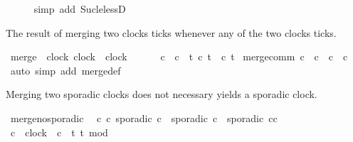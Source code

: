 \begin{isabellebody}
\ \ \ \ \isamarkupfalse%
\ {\isacharparenleft}simp\ add{\isacharcolon}\ Suc{\isacharunderscore}le{\isacharunderscore}lessD{\isacharparenright}\isanewline
{}\isamarkupfalse%
%
\endisatagproof
{\isafoldproof}%
%
\isadelimproof
%
\endisadelimproof
%
\isadelimdocument
%
\endisadelimdocument
%
\isatagdocument
%
\isamarkuptrue%
%
\endisatagdocument
{\isafolddocument}%
%
\isadelimdocument
%
\endisadelimdocument
%
\begin{isamarkuptext}%
The result of merging two clocks ticks whenever any of the two clocks ticks.%
\end{isamarkuptext}\isamarkuptrue%
\isamarkupfalse%
\ merge\ {\isacharcolon}{\isacharcolon}\ {\isacartoucheopen}{\isacharbrackleft}clock{\isacharcomma}\ clock{\isacharbrackright}\ {\isasymRightarrow}\ clock{\isacartoucheclose}\ {\isacharparenleft}\ {\isacartoucheopen}{\isasymoplus}{\isacartoucheclose}\ {}{}{\isacharparenright}\isanewline
\ \ \ {\isacartoucheopen}c{}\ {\isasymoplus}\ c{}\ {\isasymequiv}\ {\isasymlambda}t{\isachardot}\ c{}\ t\ {\isasymor}\ c{}\ t{\isacartoucheclose}\isanewline
\isanewline
{}\isamarkupfalse%
\ merge{\isacharunderscore}comm{\isacharcolon}\ {\isacartoucheopen}c\ {\isasymoplus}\ c{\isacharprime}\ {\isacharequal}\ c{\isacharprime}\ {\isasymoplus}\ c{\isacartoucheclose}\isanewline
%
\isadelimproof
%
\endisadelimproof
%
\isatagproof
{}\isamarkupfalse%
\ {\isacharparenleft}auto\ simp\ add{\isacharcolon}\ merge{\isacharunderscore}def{\isacharparenright}%
\endisatagproof
{\isafoldproof}%
%
\isadelimproof
%
\endisadelimproof
%
\begin{isamarkuptext}%
Merging two sporadic clocks does not necessary yields a sporadic clock.%
\end{isamarkuptext}\isamarkuptrue%
\isamarkupfalse%
\ merge{\isacharunderscore}no{\isacharunderscore}sporadic{\isacharcolon}\isanewline
\ \ {\isacartoucheopen}{\isasymexists}c\ c{\isacharprime}{\isachardot}\ sporadic\ c\ {\isasymand}\ sporadic\ c{\isacharprime}\ {\isasymand}\ {\isasymnot}sporadic\ {\isacharparenleft}c{\isasymoplus}c{\isacharprime}{\isacharparenright}{\isacartoucheclose}\isanewline
%
\isadelimproof
%
\endisadelimproof
%
\isatagproof
{}\isamarkupfalse%
\ {\isacharminus}\isanewline
\ \ \isamarkupfalse%
\ c\ {\isacharcolon}{\isacharcolon}\ clock\ \ {\isacartoucheopen}c\ {\isacharequal}\ {\isacharparenleft}{\isasymlambda}t{\isachardot}\ t\ mod\ {}\ {\isacharequal}\ {}{\isacharparenright}{\isacartoucheclose}\isanewline

\end{isabellebody}
